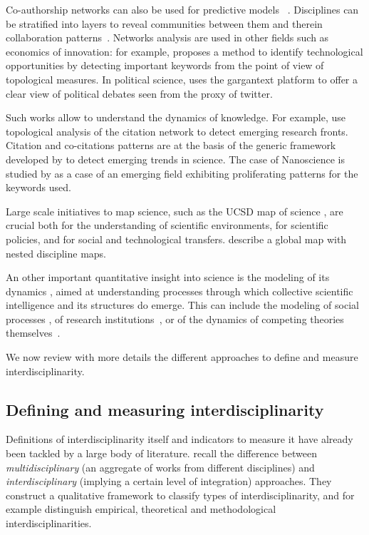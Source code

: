 Co-authorship networks can also be used for predictive models ~\citep{2014arXiv1402.7268S}. Disciplines can be stratified into layers to reveal communities between them and therein collaboration patterns~\citep{2015arXiv150601280B}. Networks analysis are used in other fields such as economics of innovation: for example, \cite{choi2014patent} proposes a method to identify technological opportunities by detecting important keywords from the point of view of topological measures. In political science, \cite{gaumont2017methods} uses the gargantext platform to offer a clear view of political debates seen from the proxy of twitter.

Such works allow to understand the dynamics of knowledge. For example, \cite{shibata2008detecting} use topological analysis of the citation network to detect emerging research fronts. Citation and co-citations patterns are at the basis of the generic framework developed by \cite{chen2006citespace} to detect emerging trends in science. The case of Nanoscience is studied by \cite{bonaccorsi2010proliferation} as a case of an emerging field exhibiting proliferating patterns for the keywords used.

Large scale initiatives to map science, such as the UCSD map of science \citep{borner2012design}, are crucial both for the understanding of scientific environments, for scientific policies, and for social and technological transfers. \cite{leydesdorff2009global} describe a global map with nested discipline maps.

An other important quantitative insight into science is the modeling of its dynamics \citep{borner2011modeling,scharnhorst2012models}, aimed at understanding processes through which collective scientific intelligence and its structures do emerge. This can include the modeling of social processes \citep{edmonds2011simulating}, of research institutions~\citep{Rouse12582}, or of the dynamics of competing theories themselves~\citep{Akerlof13228}.


We now review with more details the different approaches to define and measure interdisciplinarity.


\subsection*{Defining and measuring interdisciplinarity}

Definitions of interdisciplinarity itself and indicators to measure it have already been tackled by a large body of literature. \cite{huutoniemi2010analyzing} recall the difference between \emph{multidisciplinary} (an aggregate of works from different disciplines) and \emph{interdisciplinary} (implying a certain level of integration) approaches. They construct a qualitative framework to classify types of interdisciplinarity, and for example distinguish empirical, theoretical and methodological interdisciplinarities.


